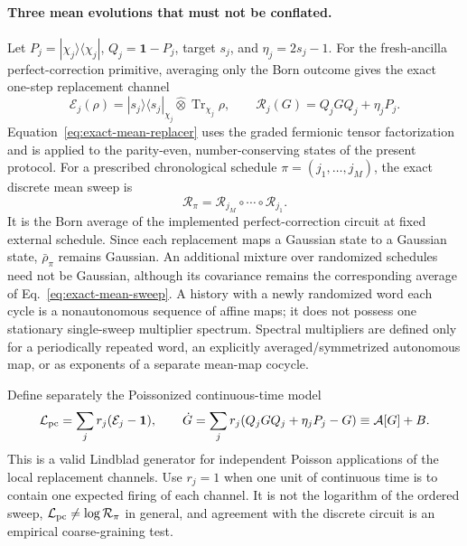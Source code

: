 \documentclass[aps,prx,onecolumn,nofootinbib,superscriptaddress,longbibliography]{revtex4-2}
\newcommand{\Id}{\mathbf{1}}
\newcommand{\qTr}{\operatorname{Tr}}
\begin{document}
\paragraph{Three mean evolutions that must not be conflated.}
Let $P_j=|\chi_j\rangle\langle\chi_j|$, $Q_j=\Id-P_j$, target $s_j$, and
$\eta_j=2s_j-1$.  For the fresh-ancilla perfect-correction primitive, averaging only the
Born outcome gives the exact one-step replacement channel
\begin{equation}
 \mathcal E_j(\rho)
 =|s_j\rangle\!\langle s_j|_{\chi_j}\widehat\otimes\qTr_{\chi_j}\rho,
 \qquad
\mathcal R_j(G)=Q_jGQ_j+\eta_jP_j .
\label{eq:exact-mean-replacer}
\end{equation}
Equation~\eqref{eq:exact-mean-replacer} uses the graded fermionic tensor factorization and
is applied to the parity-even, number-conserving states of the present protocol.
For a prescribed chronological schedule $\pi=(j_1,\ldots,j_M)$, the exact discrete mean
sweep is
\begin{equation}
 \mathcal R_\pi
 =\mathcal R_{j_M}\circ\cdots\circ\mathcal R_{j_1}.
 \label{eq:exact-mean-sweep}
\end{equation}
It is the Born average of the implemented perfect-correction circuit at fixed external
schedule.  Since each replacement maps a Gaussian state to a Gaussian state,
$\bar\rho_\pi$ remains Gaussian.  An additional mixture over randomized schedules need not
be Gaussian, although its covariance remains the corresponding average of
Eq.~\eqref{eq:exact-mean-sweep}.  A history with a newly randomized word each cycle is a
nonautonomous sequence of affine maps; it does not possess one stationary single-sweep
multiplier spectrum.  Spectral multipliers are defined only for a periodically repeated
word, an explicitly averaged/symmetrized autonomous map, or as exponents of a separate
mean-map cocycle.

Define separately the Poissonized continuous-time model
\begin{equation}
 \mathcal L_{\rm pc}=\sum_j r_j(\mathcal E_j-\mathbf{1}),
 \qquad
 \dot G=\sum_jr_j\!\left(Q_jGQ_j+\eta_jP_j-G\right)
       \equiv\mathcal A[G]+B .
 \label{eq:poisson-perfect-correction}
\end{equation}
This is a valid Lindblad generator for independent Poisson applications of the local
replacement channels.  Use $r_j=1$ when one unit of continuous time is to contain one
expected firing of each channel.  It is not the logarithm of the ordered sweep,
$\mathcal L_{\rm pc}\ne\log\mathcal R_\pi$ in general, and agreement with the discrete
circuit is an empirical coarse-graining test.
\end{document}
